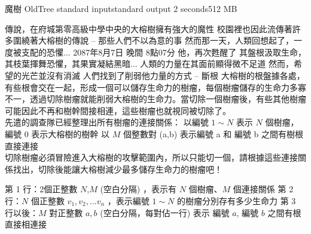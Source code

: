 \gdef\thisproblemauthor{}
\gdef\thisproblemdeveloper{}
\gdef\thisproblemorigin{}
\begin{problem}{魔樹 OldTree}
{standard input}{standard output}
{2 seconds}{512 MB}{}

傳說，在府城第零高級中學中央的大榕樹擁有強大的魔性\newline
校園裡也因此流傳著許多圍繞著大榕樹的傳說 -- 那些人們不以為意的事\newline
然而那一天，人類回想起了，一度被支配的恐懼...\newline
\newline
2087年8月7日 晚間 8點07分\newline
他，再次甦醒了\newline
其盤根汲取生命，其枝葉揮舞恐懼，其果實凝結黑暗...\newline
人類的力量在其面前顯得微不足道\newline
然而，希望的光芒並沒有消滅\newline
人們找到了削弱他力量的方式 -- 斷根\newline
\newline
大榕樹的根盤據各處，有些根會交在一起，形成一個可以儲存生命力的樹瘤，每個樹瘤儲存的生命力多寡不一，透過切除樹瘤就能削弱大榕樹的生命力。當切除一個樹瘤後，有些其他樹瘤可能因此不再和樹幹間接相連，這些樹瘤也就視同被切除了。\\
\newline
先遣的調查隊已經整理出所有樹瘤的連接關係：\newline
以編號 $1 \sim N$ 表示 $N$ 個樹瘤，編號 0 表示大榕樹的樹幹\newline
以 $M$ 個整數對 (a,b) 表示編號 a 和 編號 b 之間有樹根直接連接\\
\newline
切除樹瘤必須冒險進入大榕樹的攻擊範圍內，所以只能切一個，請根據這些連接關係找出，切除後能讓大榕樹減少最多儲存生命力的樹瘤吧！\newline


\InputFile

第 1 行：2個正整數 $N$,$M$ (空白分隔) ，表示有 $N$ 個樹瘤、$M$ 個連接關係 \newline
第 2 行：$N$ 個正整數 $v_1,v_2,...v_n$ ，表示編號 $1 \sim N$ 的樹瘤分別存有多少生命力 \newline
第 3 行以後：$M$ 對正整數 $a,b$ (空白分隔，每對佔一行) \newline
                      表示 編號 $a$, 編號 $b$ 之間有根直接相連接  \newline


\end{problem}
